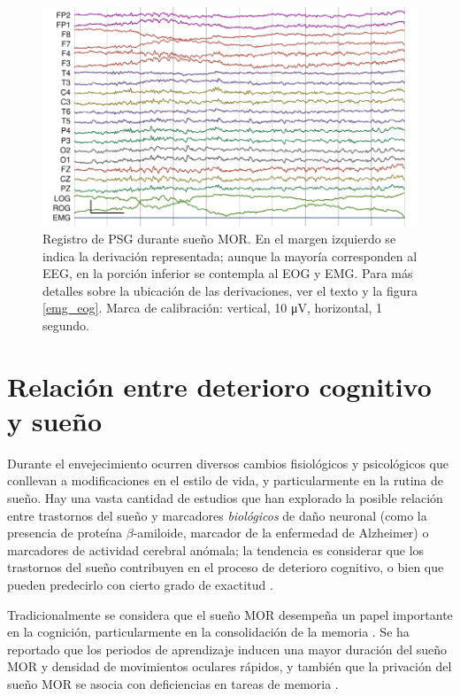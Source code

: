 \documentclass[12pt,letterpaper]{book}
\newcommand{\mv}{\si{\micro\volt}\xspace}
\begin{document}
\begin{figure}
\centering
\includegraphics[width=\linewidth]
{./img_ejemplos/MJNN_epoca_stam.pdf}
\caption[Registro de polisomnograma durante sueño MOR]
{Registro de PSG durante sueño MOR. En el margen izquierdo se indica la derivación representada; aunque la mayoría corresponden al EEG, en la porción inferior se contempla al EOG y EMG.
Para más detalles sobre la ubicación de las derivaciones, ver el texto y la figura \ref{emg_eog}. Marca de calibración: vertical, 10 \mv, horizontal, 1 segundo.}
\label{ejemplos_mor}
\end{figure}


\section{Relación entre deterioro cognitivo y sueño}
\label{sec:pdcl_sueno}

Durante el envejecimiento ocurren diversos cambios fisiológicos y psicológicos que conllevan a modificaciones en el estilo de vida, y particularmente en la rutina de sueño.
%
Hay una vasta cantidad de estudios que han explorado la posible relación entre trastornos del sueño y marcadores \textit{biológicos} de daño neuronal (como la presencia de proteína $\beta$-amiloide, marcador de la enfermedad de Alzheimer) o marcadores de actividad cerebral anómala; la tendencia es considerar que los trastornos del sueño contribuyen en el proceso de deterioro cognitivo, o bien que pueden predecirlo con cierto grado de exactitud \cite{porter15}.

Tradicionalmente se considera que el sueño MOR desempeña un papel importante en la cognición, particularmente en la consolidación de la memoria \cite{Corsi1983}.
%
Se ha reportado que los periodos de aprendizaje inducen una mayor duración del sueño MOR y densidad de movimientos oculares rápidos, y también que la privación del sueño MOR se asocia con deficiencias en tareas de memoria \cite{smith96,smith01}.
\end{document}
